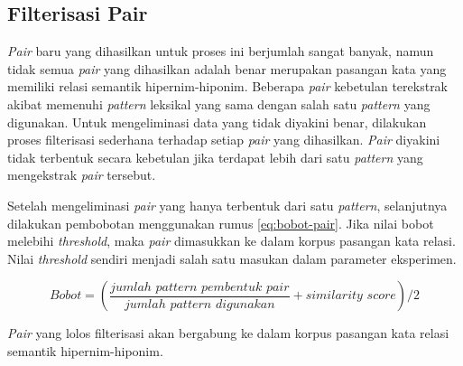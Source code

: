 \subsection{Filterisasi Pair}
\textit{Pair} baru yang dihasilkan untuk proses ini berjumlah sangat banyak, namun tidak semua \textit{pair} yang dihasilkan adalah benar merupakan pasangan kata yang memiliki relasi semantik hipernim-hiponim. Beberapa \textit{pair} kebetulan terekstrak akibat memenuhi \textit{pattern} leksikal yang sama dengan salah satu \textit{pattern} yang digunakan. Untuk mengeliminasi data yang tidak diyakini benar, dilakukan proses filterisasi sederhana terhadap setiap \textit{pair} yang dihasilkan. \textit{Pair} diyakini tidak terbentuk secara kebetulan jika terdapat lebih dari satu \textit{pattern} yang mengekstrak \textit{pair} tersebut. 

Setelah mengeliminasi \textit{pair} yang hanya terbentuk dari satu \textit{pattern}, selanjutnya dilakukan pembobotan menggunakan rumus \ref{eq:bobot-pair}. Jika nilai bobot melebihi \textit{threshold}, maka \textit{pair} dimasukkan ke dalam korpus pasangan kata relasi. Nilai \textit{threshold} sendiri menjadi salah satu masukan dalam parameter eksperimen.

\begin{equation}
\label{eq:bobot-pair}
Bobot = (\frac{jumlah\,\,pattern\,\,pembentuk\,\,pair}{jumlah\,\,pattern\,\,digunakan} + similarity\,\,score)/2
\end{equation}

\noindent \textit{Pair} yang lolos filterisasi akan bergabung ke dalam korpus pasangan kata relasi semantik hipernim-hiponim.
%

%
